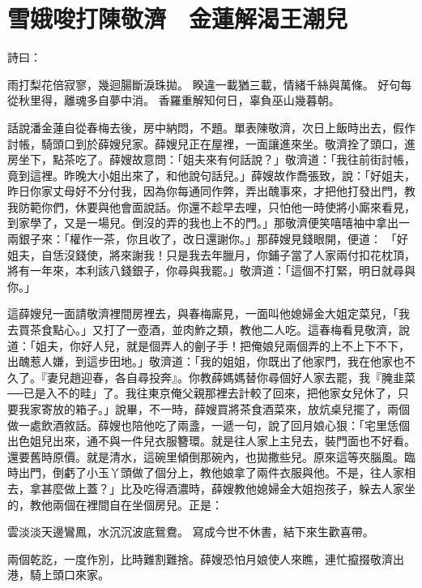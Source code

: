 %

\chapter{雪娥唆打陳敬濟　金蓮解渴王潮兒}

詩曰：

雨打梨花倍寂寥，幾迴腸斷淚珠拋。
睽違一載猶三載，情緒千絲與萬條。
好句每從秋里得，離魂多自夢中消。
香羅重解知何日，辜負巫山幾暮朝。

話說潘金蓮自從春梅去後，房中納悶，不題。單表陳敬濟，次日上飯時出去，假作討帳，騎頭口到於薛嫂兒家。薛嫂兒正在屋裡，一面讓進來坐。敬濟拴了頭口，進房坐下，點茶吃了。薛嫂故意問：「姐夫來有何話說？」敬濟道：「我往前街討帳，竟到這裡。昨晚大小姐出來了，和他說句話兒。」薛嫂故作喬張致，說：「好姐夫，昨日你家丈母好不分付我，因為你每通同作弊，弄出醜事來，才把他打發出門，教我防範你們，休要與他會面說話。你還不趁早去哩，只怕他一時使將小廝來看見，到家學了，又是一場兒。倒沒的弄的我也上不的門。」那敬濟便笑嘻嘻袖中拿出一兩銀子來：「權作一茶，你且收了，改日還謝你。」那薛嫂見錢眼開，便道： 「好姐夫，自恁沒錢使，將來謝我！只是我去年臘月，你鋪子當了人家兩付扣花枕頂，將有一年來，本利該八錢銀子，你尋與我罷。」敬濟道：「這個不打緊，明日就尋與你。」

這薛嫂兒一面請敬濟裡間房裡去，與春梅廝見，一面叫他媳婦金大姐定菜兒，「我去買茶食點心。」又打了一壺酒，並肉鮓之類，教他二人吃。這春梅看見敬濟，說道：「姐夫，你好人兒，就是個弄人的劊子手！把俺娘兒兩個弄的上不上下不下，出醜惹人嫌，到這步田地。」敬濟道：「我的姐姐，你既出了他家門，我在他家也不久了。『妻兒趙迎春，各自尋投奔』。你教薛媽媽替你尋個好人家去罷，我『腌韭菜──已是入不的畦」了。我往東京俺父親那裡去計較了回來，把他家女兒休了，只要我家寄放的箱子。」說畢，不一時，薛嫂買將茶食酒菜來，放炕桌兒擺了，兩個做一處飲酒敘話。薛嫂也陪他吃了兩盞，一遞一句，說了回月娘心狠：「宅里恁個出色姐兒出來，通不與一件兒衣服簪環。就是往人家上主兒去，裝門面也不好看。還要舊時原價。就是清水，這碗里傾倒那碗內，也拋撒些兒。原來這等夾腦風。臨時出門，倒虧了小玉丫頭做了個分上，教他娘拿了兩件衣服與他。不是，往人家相去，拿甚麼做上蓋？」比及吃得酒濃時，薛嫂教他媳婦金大姐抱孩子，躲去人家坐的，教他兩個在裡間自在坐個房兒。正是：

雲淡淡天邊鸞鳳，水沉沉波底鴛鴦。
寫成今世不休書，結下來生歡喜帶。

兩個乾訖，一度作別，比時難割難捨。薛嫂恐怕月娘使人來瞧，連忙攛掇敬濟出港，騎上頭口來家。

